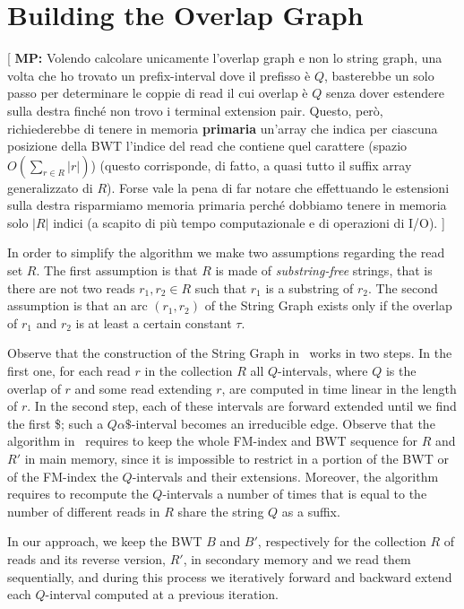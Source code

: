 \documentclass[runningheads,envcountsame,a4paper]{llncs}
\newcommand{\notaestesa}[2]{%
 \marginpar{\color{red!75!black}\textbf{\texttimes}}%
 {\color{red!75!black}%
 [\,\textbullet\,\textsf{\textbf{#1:}} %
 \textsf{\footnotesize#2}\,\textbullet\,]}%
}
\newcommand{\MP}[1]{\notaestesa{MP}{#1}}
\begin{document}
\section{Building the Overlap Graph}

\MP{Volendo calcolare unicamente l'overlap graph e non lo string graph,
una volta che ho trovato un prefix-interval dove il prefisso è $Q$,
basterebbe un solo passo per determinare le coppie di read il cui
overlap è $Q$ senza dover estendere sulla destra finché non trovo i
terminal extension pair. Questo, però, richiederebbe di tenere in
memoria \textbf{primaria} un'array che indica per ciascuna posizione
della BWT l'indice del read che contiene quel carattere (spazio
$O(\sum_{r \in R} |r|)$) (questo corrisponde, di fatto, a quasi tutto il
suffix array generalizzato di $R$). Forse vale la pena di far notare che
effettuando le estensioni sulla destra risparmiamo memoria primaria
perché dobbiamo tenere in memoria solo $|R|$ indici (a scapito di più
tempo computazionale e di operazioni di I/O).}






In order to simplify the algorithm we make two assumptions regarding the read set $R$.
The first assumption is that $R$ is made of \emph{substring-free} strings, that is there are not two reads $r_{1}, r_{2}\in R$ such that
$r_{1}$  is a substring of  $r_{2}$.
The second assumption is that an arc $(r_{1}, r_{2})$ of the String Graph exists only if the overlap of $r_{1}$ and $r_{2}$ is at least a certain constant $\tau$.



Observe that the construction of the String Graph in~\cite{Simpson2010} works in two
steps.
In the first one, for each read $r$ in the collection $R$ all
$Q$-intervals, where $Q$ is the overlap of $r$ and some read extending $r$,
are computed in time linear in
the  length of $r$.
In the second step, each of these intervals are forward extended until
we find the first \$; such a $Q\alpha\$$-interval becomes an
irreducible edge.
Observe that the algorithm  in~\cite{Simpson2010} requires to keep the whole FM-index
and BWT sequence for $R$ and $R'$ in main memory, since it is impossible to
restrict in a portion of the BWT or of the FM-index the $Q$-intervals
and their extensions.
Moreover, the algorithm requires to recompute the $Q$-intervals a number of
times that is equal to the number of different reads in $R$ share the
string $Q$ as a suffix.


In our approach, we keep the BWT $B$  and  $B'$, respectively  for the collection $R$ of reads and its
reverse version, $R'$,  in secondary memory and we read them sequentially,
and during this process we iteratively forward and backward extend each
$Q$-interval computed at a previous iteration.
\end{document}
